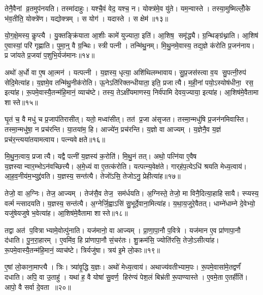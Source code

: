 तेनै॒वैनां व्र॒तमुप॑नयति। तस्मा॑दाहुः। यश्चै॒वं वेद॒ यश्च॒ न। योक्त्र॑मे॒व यु॑ते। यम॒न्वास्ते। तस्या॒मुष्मिल्लोँ॒के भ॑व॒तीति॒ योक्त्रे॑ण। यद्योक्त्रम्। स योग॑। यदास्ते। स क्षेम॑॥१३॥

यो॒ग॒क्षे॒मस्य॒ कॢप्त्यै। यु॒क्तङ्क्रि॑याता आ॒शीः कामे॑ युज्याता॒ इति॑। आ॒शिष॒ समृ॑द्ध्यै। ग्र॒न्थिङ्ग्र॑थ्नाति। आ॒शिष॑ ए॒वास्यां॒ परि॑ गृह्णाति। पुमा॒न्॒ वै ग्र॒न्थिः। स्त्री पत्नी। तन्मि॑थु॒नम्। मि॒थु॒नमे॒वास्य॒ तद्य॒ज्ञे क॑रोति प्र॒जन॑नाय। प्र जा॑यते प्र॒जया॑ प॒शुभि॒र्यज॑मानः॥१४॥

अथो॑ अ॒र्धो वा ए॒ष आ॒त्मन॑। यत्पत्नी। य॒ज्ञस्य॒ धृत्या॒ अशि॑थिलम्भावाय। सु॒प्र॒जस॑स्त्वा व॒य सु॒पत्नी॒रुप॑ सेदि॒मेत्या॑ह। य॒ज्ञमे॒व तन्मि॑थु॒नीक॑रोति। ऊ॒नेऽति॑रिक्तन्धीयाता॒ इति॒ प्रजात्यै। म॒ही॒नां पयो॒ऽस्योष॑धीना॒ रस॒ इत्या॑ह। रू॒पमे॒वास्यै॒तन्म॑हि॒मानं॒ व्याच॑ष्टे। तस्य॒ तेऽक्षी॑यमाणस्य॒ निर्व॑पामि देवय॒ज्याया॒ इत्या॑ह। आ॒शिष॑मे॒वैतामा शास्ते॥१५॥\anuvakamend[क॒रोति॑ व्रतोप॒नय॑नं॒ क्षेमो॒ यज॑मानः शास्ते]

घृ॒तं च॒ वै मधु॑ च प्र॒जाप॑तिरासीत्। यतो॒ मध्वा॑सीत्। तत॑ प्र॒जा अ॑सृजत। तस्मा॒न्मधु॑षि प्र॒जन॑नमिवास्ति। तस्मा॒न्मधु॑षा॒ न प्रच॑रन्ति। या॒तया॑म॒ हि। आज्ये॑न॒ प्रच॑रन्ति। य॒ज्ञो वा आज्यम्। य॒ज्ञेनै॒व य॒ज्ञं प्रच॑र॒न्त्यया॑तयामत्वाय। पत्न्यवेक्षते॥१६॥

मि॒थु॒न॒त्वाय॒ प्रजात्यै। यद्वै पत्नी॑ य॒ज्ञस्य॑ क॒रोति॑। मि॒थु॒नं तत्। अथो॒ पत्नि॑या ए॒वैष य॒ज्ञस्यान्वार॒म्भोऽन॑वच्छित्त्यै। अ॒मे॒ध्यं वा ए॒तत्क॑रोति। यत्पत्न्य॒वेक्ष॑ते। गार्‌ह॑प॒त्येऽधि॑ श्रयति मेध्य॒त्वाय॑। आ॒ह॒व॒नीय॑म॒भ्युद्द्र॑वति। य॒ज्ञस्य॒ सन्त॑त्यै। तेजो॑ऽसि॒ तेजोऽनु॒ प्रेहीत्या॑ह॥१७॥

तेजो॒ वा अ॒ग्निः। तेज॒ आज्यम्। तेज॑सै॒व तेज॒ सम॑र्धयति। अ॒ग्निस्ते॒ तेजो॒ मा विनै॒दित्या॒हाहिसायै। स्प्यस्य॒ वर्त्मन्त्सादयति। य॒ज्ञस्य॒ सन्त॑त्यै। अ॒ग्नेर्जि॒ह्वाऽसि॑ सु॒भूर्दे॒वाना॒मित्या॑ह। य॒था॒य॒जुरे॒वैतत्। धाम्ने॑धाम्ने दे॒वेभ्यो॒ यजु॑षेयजुषे भ॒वेत्या॑ह। आ॒शिष॑मे॒वैतामा शास्ते॥१८॥

तद्वा अत॑ प॒वित्राभ्यामे॒वोत्पु॑नाति। यज॑मानो॒ वा आज्यम्। प्रा॒णा॒पा॒नौ प॒वित्रे। यज॑मान ए॒व प्रा॑णापा॒नौ द॑धाति। पु॒न॒रा॒हारम्। ए॒वमि॑व॒ हि प्रा॑णापा॒नौ सं॒चर॑तः। शु॒क्रम॑सि॒ ज्योति॑रसि॒ तेजो॒ऽसीत्या॑ह। रू॒पमे॒वास्यै॒तन्म॑हि॒मानं॒ व्याच॑ष्टे। त्रिर्यजु॑षा। त्रय॑ इ॒मे लो॒काः॥१९॥

ए॒षां लो॒काना॒माप्त्यै। त्रिः। त्र्या॑वृ॒द्धि य॒ज्ञः। अथो॑ मेध्य॒त्वाय॑। अथाज्य॑वतीभ्याम॒पः। रू॒पमे॒वासा॑मे॒तद्वर्णं॑ दधाति। अपि॒ वा उ॒ताहु॑। यथा॑ ह॒ वै योषा॑ सु॒वर्ण॒ हिर॑ण्यं पेश॒लं बिभ्र॑ती रू॒पाण्यास्ते। ए॒वमे॒ता ए॒तर्\mbox{}हीति॑। आपो॒ वै सर्वा दे॒वता॥२०॥

